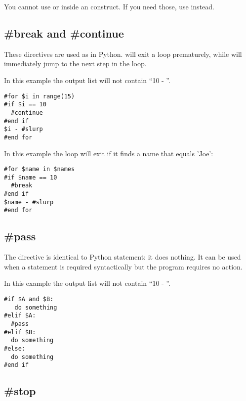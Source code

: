 You cannot use  or  inside an 
construct.  If you need those, use  instead.

\subsection{\#break and \#continue}
\label{flowControl.break}

These directives are used as in Python.  will
exit a  loop prematurely, while  will immediately
jump to the next step in the  loop.

In this example the output list will not contain ``10 - ''. 
\begin{verbatim}
#for $i in range(15)
#if $i == 10
  #continue
#end if
$i - #slurp
#end for
\end{verbatim}

In this example the loop will exit if it finds a name that equals 'Joe':
\begin{verbatim}
#for $name in $names
#if $name == 10
  #break
#end if
$name - #slurp
#end for
\end{verbatim}


\subsection{\#pass}
\label{flowControl.break}

The  directive is identical to Python  statement: it
does nothing. It can be used when a statement is required syntactically but the
program requires no action.

In this example the output list will not contain ``10 - ''. 
\begin{verbatim}
#if $A and $B:
   do something
#elif $A:
  #pass
#elif $B: 
  do something
#else:
  do something
#end if
\end{verbatim}


\subsection{\#stop}
\label{flowControl.stop}

